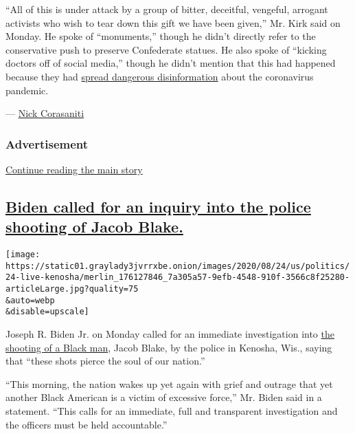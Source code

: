 ``All of this is under attack by a group of bitter, deceitful, vengeful,
arrogant activists who wish to tear down this gift we have been given,''
Mr. Kirk said on Monday. He spoke of ``monuments,'' though he didn't
directly refer to the conservative push to preserve Confederate statues.
He also spoke of ``kicking doctors off of social media,'' though he
didn't mention that this had happened because they had
\href{https://www.nytimes3xbfgragh.onion/2020/07/28/technology/virus-video-trump.html}{spread
dangerous disinformation} about the coronavirus pandemic.

--- \href{https://www.nytimes3xbfgragh.onion/by/nick-corasaniti}{Nick
Corasaniti}

\hypertarget{advertisement-6}{%
\subsubsection{Advertisement}\label{advertisement-6}}

\protect\hyperlink{after-dfp-ad-mid7}{Continue reading the main story}

\hypertarget{biden-called-for-an-inquiry-into-the-police-shooting-of-jacob-blake}{%
\subsection{\texorpdfstring{\protect\hyperlink{biden-called-for-an-inquiry-into-the-police-shooting-of-jacob-blake}{Biden
called for an inquiry into the police shooting of Jacob
Blake.}}{Biden called for an inquiry into the police shooting of Jacob Blake.}}\label{biden-called-for-an-inquiry-into-the-police-shooting-of-jacob-blake}}

\texttt{[image: https://static01.graylady3jvrrxbe.onion/images/2020/08/24/us/politics/24-live-kenosha/merlin\_176127846\_7a305a57-9efb-4548-910f-3566c8f25280-articleLarge.jpg?quality=75\\\&auto=webp\\\&disable=upscale]}

Joseph R. Biden Jr. on Monday called for an immediate investigation into
\href{https://www.nytimes3xbfgragh.onion/2020/08/24/us/kenosha-police-shooting.html}{the
shooting of a Black man}, Jacob Blake, by the police in Kenosha, Wis.,
saying that ``these shots pierce the soul of our nation.''

``This morning, the nation wakes up yet again with grief and outrage
that yet another Black American is a victim of excessive force,'' Mr.
Biden said in a statement. ``This calls for an immediate, full and
transparent investigation and the officers must be held accountable.''

